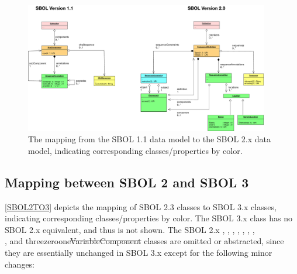 \begin{figure}[htp]
\begin{center}
  \includegraphics[width=0.95\textwidth]{images/sbol_v1_to_v2}
\end{center}
\caption{\label{SBOL1TO2}The mapping from the SBOL 1.1 data model to the SBOL 2.x  data model, indicating corresponding classes/properties by color.}
\end{figure}



\subsection{Mapping between SBOL 2 and SBOL 3}

\ref{SBOL2TO3} depicts the mapping of SBOL 2.3 classes to SBOL 3.x classes, indicating corresponding classes/properties by color.   
The SBOL 3.x  class has no SBOL 2.x equivalent, and thus is not shown.
The SBOL 2.x , , , , , , , \\
, and threezeroone{\st{VariableComponent}}  classes are omitted or abstracted, since they are essentially unchanged in SBOL 3.x except for the following minor changes:

